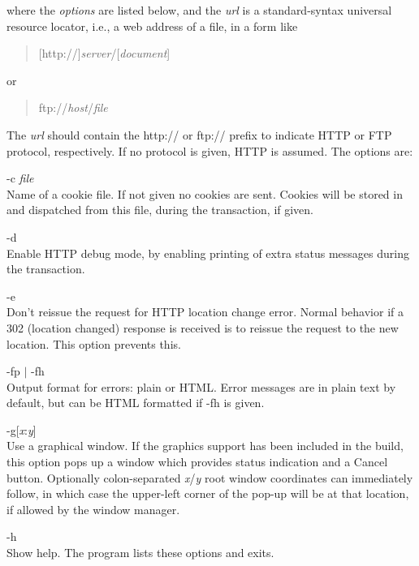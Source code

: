 where the {\it options} are listed below, and the {\it url} is a
standard-syntax universal resource locator, i.e., a web address of a
file, in a form like

\begin{quote}
[{\vt http://}]{\it server\/}/[{\it document\/}]
\end{quote}
or
\begin{quote}
{\vt ftp://}{\it host\/}{\vt /}{\it file}
\end{quote}

The {\it url} should contain the {\vt http://} or {\vt ftp://} prefix
to indicate HTTP or FTP protocol, respectively.  If no protocol is
given, HTTP is assumed.  The options are:

\begin{description}
\item{\vt -c} {\it file}\\
Name of a cookie file.  If not given no cookies are sent.  Cookies
will be stored in and dispatched from this file, during the
transaction, if given.

\item{\vt -d}\\
Enable HTTP debug mode, by enabling printing of extra status messages
during the transaction.

\item{\vt -e}\\
Don't reissue the request for HTTP location change error.  Normal
behavior if a 302 (location changed) response is received is to
reissue the request to the new location.  This option prevents this.

\item{\vt -fp} $|$ {\vt -fh}\\
Output format for errors:  plain or HTML.  Error messages are in plain
text by default, but can be HTML formatted if {\vt -fh} is given.

\item{\vt -g}[{\it x\/}{\vt :}{\it y\/}]\\
Use a graphical window.  If the graphics support has been included in
the build, this option pops up a window which provides status
indication and a {\cb Cancel} button.  Optionally colon-separated {\it
x}/{\it y} root window coordinates can immediately follow, in which
case the upper-left corner of the pop-up will be at that location, if
allowed by the window manager.

\item{\vt -h}\\
Show help.  The program lists these options and exits.


\end{description}
